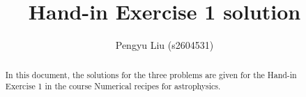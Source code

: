 \documentclass[a4paper,10pt]{article}
\title{Hand-in Exercise 1 solution}
\author{Pengyu Liu (s2604531)}
\begin{document}
\maketitle

\begin{abstract}
In this document, the solutions for the three problems are given for the Hand-in Exercise 1 in the course Numerical recipes for astrophysics.

\end{abstract}






\end{document}
